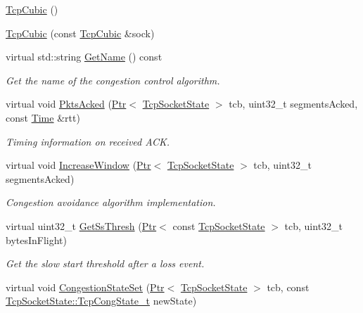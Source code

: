 \begin{DoxyCompactItemize}
\item 
\hyperlink{classns3_1_1TcpCubic_a1c43c3ed778ae0feb07c505e4dcbeffb}{Tcp\+Cubic} ()
\item 
\hyperlink{classns3_1_1TcpCubic_a921d9edef959e2603ae09c43cf8a82da}{Tcp\+Cubic} (const \hyperlink{classns3_1_1TcpCubic}{Tcp\+Cubic} \&sock)
\item 
virtual std\+::string \hyperlink{classns3_1_1TcpCubic_ae1e17804b13f8f788ab683fbe0e467bd}{Get\+Name} () const 
\begin{DoxyCompactList}\small\item\em Get the name of the congestion control algorithm. \end{DoxyCompactList}\item 
virtual void \hyperlink{classns3_1_1TcpCubic_abcd72325d169bdd2a3858825aea8ca51}{Pkts\+Acked} (\hyperlink{classns3_1_1Ptr}{Ptr}$<$ \hyperlink{classns3_1_1TcpSocketState}{Tcp\+Socket\+State} $>$ tcb, uint32\+\_\+t segments\+Acked, const \hyperlink{classns3_1_1Time}{Time} \&rtt)
\begin{DoxyCompactList}\small\item\em Timing information on received A\+CK. \end{DoxyCompactList}\item 
virtual void \hyperlink{classns3_1_1TcpCubic_a34659bfac2129d0c100d96e8ce7b24cd}{Increase\+Window} (\hyperlink{classns3_1_1Ptr}{Ptr}$<$ \hyperlink{classns3_1_1TcpSocketState}{Tcp\+Socket\+State} $>$ tcb, uint32\+\_\+t segments\+Acked)
\begin{DoxyCompactList}\small\item\em Congestion avoidance algorithm implementation. \end{DoxyCompactList}\item 
virtual uint32\+\_\+t \hyperlink{classns3_1_1TcpCubic_adced32f15c635759de55287319ce7936}{Get\+Ss\+Thresh} (\hyperlink{classns3_1_1Ptr}{Ptr}$<$ const \hyperlink{classns3_1_1TcpSocketState}{Tcp\+Socket\+State} $>$ tcb, uint32\+\_\+t bytes\+In\+Flight)
\begin{DoxyCompactList}\small\item\em Get the slow start threshold after a loss event. \end{DoxyCompactList}\item 
virtual void \hyperlink{classns3_1_1TcpCubic_ad7a054cf9c9ebe790d0c347afb1d5193}{Congestion\+State\+Set} (\hyperlink{classns3_1_1Ptr}{Ptr}$<$ \hyperlink{classns3_1_1TcpSocketState}{Tcp\+Socket\+State} $>$ tcb, const \hyperlink{classns3_1_1TcpSocketState_a6fc313945a33d48fd60cbffe0c787b19}{Tcp\+Socket\+State\+::\+Tcp\+Cong\+State\+\_\+t} new\+State)

\end{DoxyCompactItemize}
